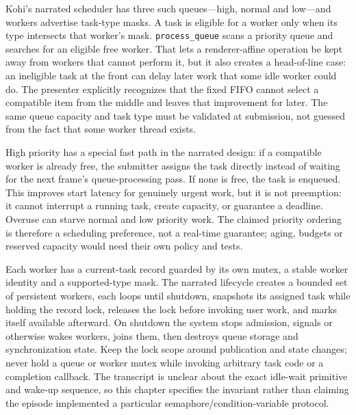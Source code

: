 Kohi's narrated scheduler has three such queues---high, normal and low---and workers advertise task-type masks. A task is eligible for a worker only when its type intersects that worker's mask. \texttt{process\_queue} scans a priority queue and searches for an eligible free worker. That lets a renderer-affine operation be kept away from workers that cannot perform it, but it also creates a head-of-line case: an ineligible task at the front can delay later work that some idle worker could do. The presenter explicitly recognizes that the fixed FIFO cannot select a compatible item from the middle and leaves that improvement for later. The same queue capacity and task type must be validated at submission, not guessed from the fact that some worker thread exists.

High priority has a special fast path in the narrated design: if a compatible worker is already free, the submitter assigns the task directly instead of waiting for the next frame's queue-processing pass. If none is free, the task is enqueued. This improves start latency for genuinely urgent work, but it is not preemption: it cannot interrupt a running task, create capacity, or guarantee a deadline. Overuse can starve normal and low priority work. The claimed priority ordering is therefore a scheduling preference, not a real-time guarantee; aging, budgets or reserved capacity would need their own policy and tests.

Each worker has a current-task record guarded by its own mutex, a stable worker identity and a supported-type mask. The narrated lifecycle creates a bounded set of persistent workers, each loops until shutdown, snapshots its assigned task while holding the record lock, releases the lock before invoking user work, and marks itself available afterward. On shutdown the system stops admission, signals or otherwise wakes workers, joins them, then destroys queue storage and synchronization state. Keep the lock scope around publication and state changes; never hold a queue or worker mutex while invoking arbitrary task code or a completion callback. The transcript is unclear about the exact idle-wait primitive and wake-up sequence, so this chapter specifies the invariant rather than claiming the episode implemented a particular semaphore/condition-variable protocol.

